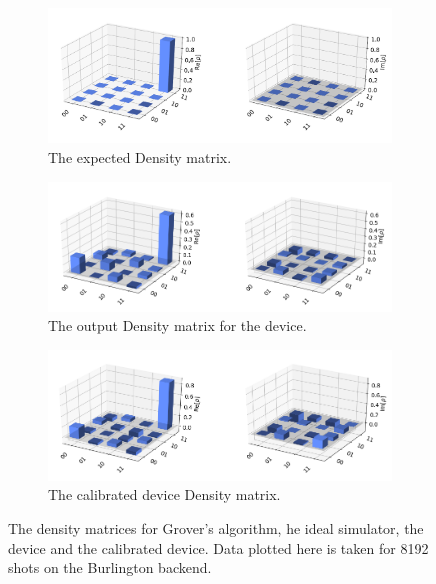 \begin{figure}[h]
	\begin{subfigure}{.5\textwidth}
		\centering
		\includegraphics[width=.8\linewidth]{images/results/grov_density_sim.png}
		\caption{The expected Density matrix.}
		\label{fig:grov_density_sim}
	\end{subfigure} \newline
	\begin{subfigure}{.5\textwidth}
		\centering
		\includegraphics[width=.8\linewidth]{images/results/grov_density_dev.png}
		\caption{The output Density matrix for the device.}
		\label{fig:grov_density_dev}
	\end{subfigure} \newline
	\begin{subfigure}{.5\textwidth}
		\centering
		\includegraphics[width=.8\linewidth]{images/results/grov_density_cal.png}
		\caption{The calibrated device Density matrix.}
		\label{fig:grov_density_cal}
	\end{subfigure}
	\caption{The density matrices for Grover's algorithm, he ideal simulator,
		the device and the calibrated device. Data plotted here is taken for 8192 shots
		on the Burlington backend.}
	\label{fig:grov_density}
\end{figure}

